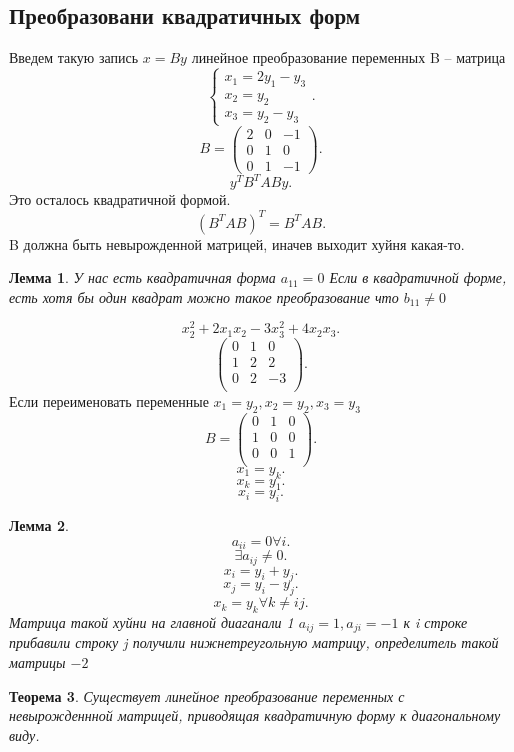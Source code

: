 \documentclass{scrartcl}
\newtheorem{theorem}{Теорема}
\newtheorem{lemma}[theorem]{Лемма}
\begin{document}
\subsection{Преобразовани квадратичных форм}
Введем такую запись $x = B y$ линейное преобразование переменных  B -- матрица
\[
    \begin{cases}
x_1 = 2y_1 - y_3\\
x_2 = y_2\\
x_3 = y_2 - y_3
    \end{cases}
.\] 
\[
B = \begin{pmatrix} 
    2 & 0 & -1\\
    0 & 1 & 0\\
    0 & 1 & -1
\end{pmatrix} 
.\] 
\[
y^{T} B^{T} A B y
.\] 
Это осталось квадратичной формой.
\[
    (B^{T} A B)^{T} = B^{T} A B
.\] 
B должна быть невырожденной матрицей, иначев выходит хуйня какая-то.
\begin{lemma}
    У нас есть квадратичная форма $a_{11} = 0$ Если в квадратичной форме, есть хотя бы один квадрат можно такое преобразование что $b_{11} \neq 0$
\end{lemma}
\[
x_2^2 + 2x_1 x_2 - 3x_{3}^2 + 4x_2 x_3
.\] 
\[
\begin{pmatrix} 
    0 & 1 & 0\\
    1 & 2 & 2\\
    0 & 2 & -3\\
\end{pmatrix} 
.\] 
Если переименовать переменные $x_1 = y_2, x_2= y_2, x_3 = y_3$
\[
B = \begin{pmatrix} 
    0 & 1 & 0\\
    1 & 0 & 0\\
    0 & 0 & 1\\
\end{pmatrix} 
.\] 
\[
x_1 = y_{k}
.\] 
\[
x_{k} = y_1
.\] 
\[
x_{i} = y_i
.\] 
\begin{lemma}
    \[
    a_{ii} = 0 \forall  i
    .\] 
    \[
    \exists  a_{ij} \neq 0
    .\] 
    \[
    x_{i} = y_{i} + y_{j}
    .\] 
    \[
    x_{j} = y_{i} - y_{j}
    .\] 
    \[
    x_{k} = y_{k} \forall k\neq i j
    .\] 
    Матрица такой хуйни на главной диаганали 1 $a_{ij} = 1, a_{ji} =-1$ к i строке прибавили строку j получили нижнетреугольную матрицу, определитель такой матрицы $-2$
\end{lemma}
\begin{theorem}
    Существует линейное преобразование переменных с невырожденнной матрицей, приводящая квадратичную форму к диагональному виду.
\end{theorem}
\end{document}
